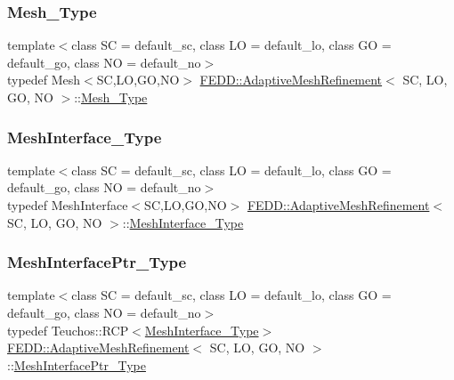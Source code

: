 \subsubsection{\texorpdfstring{Mesh\+\_\+\+Type}{Mesh\_Type}}
{\footnotesize\ttfamily template$<$class SC = default\+\_\+sc, class LO = default\+\_\+lo, class GO = default\+\_\+go, class NO = default\+\_\+no$>$ \\
typedef Mesh$<$SC,LO,GO,NO$>$ \hyperlink{classFEDD_1_1AdaptiveMeshRefinement}{F\+E\+D\+D\+::\+Adaptive\+Mesh\+Refinement}$<$ SC, LO, GO, NO $>$\+::\hyperlink{classFEDD_1_1AdaptiveMeshRefinement_a7d24de886f92d012c43fbe13d884f08b}{Mesh\+\_\+\+Type}}

\mbox{\label{classFEDD_1_1AdaptiveMeshRefinement_a2d24dca5502ca055019d31c569bf003e}} 
\subsubsection{\texorpdfstring{Mesh\+Interface\+\_\+\+Type}{MeshInterface\_Type}}
{\footnotesize\ttfamily template$<$class SC = default\+\_\+sc, class LO = default\+\_\+lo, class GO = default\+\_\+go, class NO = default\+\_\+no$>$ \\
typedef Mesh\+Interface$<$SC,LO,GO,NO$>$ \hyperlink{classFEDD_1_1AdaptiveMeshRefinement}{F\+E\+D\+D\+::\+Adaptive\+Mesh\+Refinement}$<$ SC, LO, GO, NO $>$\+::\hyperlink{classFEDD_1_1AdaptiveMeshRefinement_a2d24dca5502ca055019d31c569bf003e}{Mesh\+Interface\+\_\+\+Type}}

\mbox{\label{classFEDD_1_1AdaptiveMeshRefinement_a5d1f62bff0822daa8f0b7caf3e3b4311}} 
\subsubsection{\texorpdfstring{Mesh\+Interface\+Ptr\+\_\+\+Type}{MeshInterfacePtr\_Type}}
{\footnotesize\ttfamily template$<$class SC = default\+\_\+sc, class LO = default\+\_\+lo, class GO = default\+\_\+go, class NO = default\+\_\+no$>$ \\
typedef Teuchos\+::\+R\+CP$<$\hyperlink{classFEDD_1_1AdaptiveMeshRefinement_a2d24dca5502ca055019d31c569bf003e}{Mesh\+Interface\+\_\+\+Type}$>$ \hyperlink{classFEDD_1_1AdaptiveMeshRefinement}{F\+E\+D\+D\+::\+Adaptive\+Mesh\+Refinement}$<$ SC, LO, GO, NO $>$\+::\hyperlink{classFEDD_1_1AdaptiveMeshRefinement_a5d1f62bff0822daa8f0b7caf3e3b4311}{Mesh\+Interface\+Ptr\+\_\+\+Type}}

